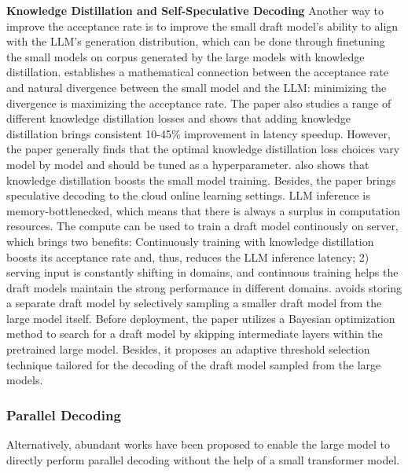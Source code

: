 \textbf{Knowledge Distillation and Self-Speculative Decoding} Another way to improve the acceptance rate is to improve the small draft model's ability to align with the LLM's generation distribution, which can be done through finetuning the small models on corpus generated by the large models with knowledge distillation. 
\cite{zhou2023distillspec} establishes a mathematical connection between the acceptance rate and natural divergence between the small model and the LLM: minimizing the divergence is maximizing the acceptance rate. The paper also studies a range of different knowledge distillation losses and shows that adding knowledge distillation brings consistent 10-45\% improvement in latency speedup. However, the paper generally finds that the optimal knowledge distillation loss choices vary model by model and should be tuned as a hyperparameter. \cite{liu2023online} also shows that knowledge distillation boosts the small model training. Besides, the paper brings speculative decoding to the cloud online learning settings. LLM inference is memory-bottlenecked, which means that there is always a surplus in computation resources. 
The compute can be used to train a draft model continously on server, which brings two benefits: Continuously training with knowledge distillation boosts its acceptance rate and, thus, reduces the LLM inference latency; 2) serving input is constantly shifting in domains, and continuous training helps the draft models maintain the strong performance in different domains. 
\cite{zhang2023draft} avoids storing a separate draft model by selectively sampling a smaller draft model from the large model itself. Before deployment, the paper utilizes a Bayesian optimization method to search for a draft model by skipping intermediate layers within the pretrained large model. Besides, it proposes an adaptive threshold selection technique tailored for the decoding of the draft model sampled from the large models. 

\subsubsection{Parallel Decoding} \label{pd} 

Alternatively, abundant works have been proposed to enable the large model to directly perform parallel decoding without the help of a small transformer model. 

